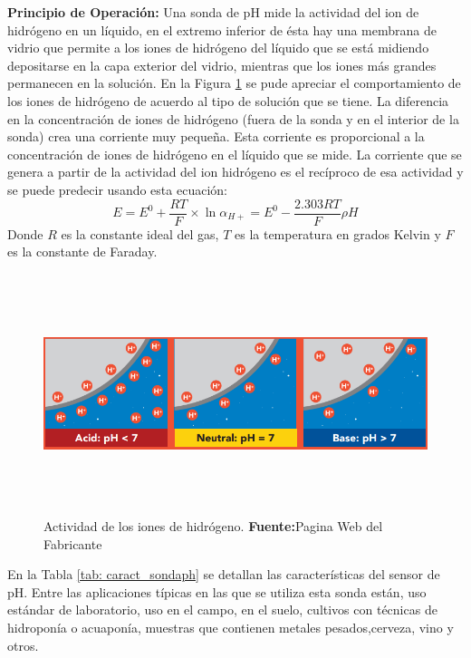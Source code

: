 \textbf{Principio de Operación: }Una sonda de pH mide la actividad del ion de hidrógeno en un líquido, en el extremo inferior de ésta hay una membrana de vidrio que permite a los iones de hidrógeno del líquido que se está midiendo depositarse en la capa exterior del vidrio, mientras que los iones más grandes permanecen en la solución. En la Figura \ref{fig:4.11} se pude apreciar el comportamiento de los iones de hidrógeno de acuerdo al tipo de solución que se tiene. La diferencia en la concentración de iones de hidrógeno (fuera de la sonda y en el interior de la sonda) crea una corriente muy pequeña. Esta corriente es proporcional a la concentración de iones de hidrógeno en el líquido que se mide.
La corriente que se genera a partir de la actividad del ion hidrógeno es el recíproco de esa actividad y se puede predecir usando esta ecuación:
\begin{equation}
E=E^0 + \frac{RT}{F}\times \ln\alpha_{H+} = E^0 - \frac{2.303RT}{F}\rho H
\label{eq:iv}
\end{equation}
Donde $R$ es la constante ideal del gas, $T$ es la temperatura en grados Kelvin y $F$ es la constante de Faraday.
\newline
\hfill
\begin{figure}[ht]
\centering
	\includegraphics[width=140mm, height=70mm]{Imagenes/2021/imag22.png}%
	\caption[Actividad de los iones de hidrógeno]{Actividad de los iones de hidrógeno.  \textbf{Fuente:}Pagina Web del Fabricante \cite{atlasph}}
	\label{fig:4.11}
\end{figure}

En la Tabla \ref{tab: caract_sondaph} se detallan las características del sensor de pH.
\newline
\hfill
Entre las aplicaciones típicas en las que se utiliza esta sonda están, uso estándar de laboratorio, uso en el campo, en el suelo, cultivos con técnicas de hidropon\'ia o acuapon\'ia, muestras que contienen metales pesados,cerveza, vino y otros.

